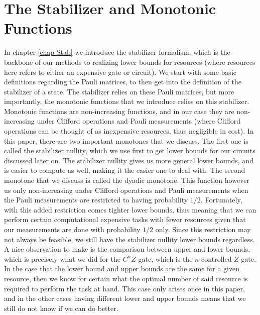 \documentclass[12pt]{dalthesis}
\begin{document}
\section{The Stabilizer and Monotonic Functions}
In chapter \ref{chap Stab} we introduce the stabilizer formalism, which is the backbone of our methods to realizing lower bounds for resources (where resources here refers to either an expensive gate or circuit). We start with some basic definitions regarding the Pauli matrices, to then get into the definition of the stabilizer of a state. The stabilizer relies on these Pauli matrices, but more importantly, the monotonic functions that we introduce relies on this stabilizer. 
Monotonic functions are non-increasing functions, and in our case they are non-increasing under Clifford operations and Pauli measurements (where Clifford operations can be thought of as inexpensive resources, thus negligible in cost). In this paper, there are two important monotones that we discuss. The first one is called the stabilizer nullity, which we use first to get lower bounds for our circuits discussed later on. The stabilizer nullity gives us more general lower bounds, and is easier to compute as well, making it the easier one to deal with. 
The second monotone that we discuss is called the dyadic monotone. This function however us only non-increasing under Clifford operations and Pauli measurements when the Pauli measurements are restricted to having probability $1/2$. Fortunately, with this added restriction comes tighter lower bounds, thus meaning that we can perform certain computational expensive tasks with fewer resources given that our measurements are done with probability $1/2$ only. Since this restriction may not always be feasible, we still have the stabilizer nullity lower bounds regardless. 
A nice observation to make is the comparison between upper and lower bounds, which is precisely what we did for the $C^nZ$ gate, which is the $n$-controlled $Z$ gate. In the case that the lower bound and upper bounds are the same for a given resource, then we know for certain what the optimal number of said resource is required to perform the task at hand. This case only arises once in this paper, and in the other cases having different lower and upper bounds means that we still do not know if we can do better. 
\end{document}
